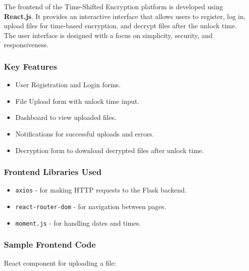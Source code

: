 \documentclass[12pt]{article}
\begin{document}
The frontend of the Time-Shifted Encryption platform is developed using \textbf{React.js}. It provides an interactive interface that allows users to register, log in, upload files for time-based encryption, and decrypt files after the unlock time. The user interface is designed with a focus on simplicity, security, and responsiveness.

\subsubsection{Key Features}

\begin{itemize}
    \item User Registration and Login forms.
    \item File Upload form with unlock time input.
    \item Dashboard to view uploaded files.
    \item Notifications for successful uploads and errors.
    \item Decryption form to download decrypted files after unlock time.
\end{itemize}

\subsubsection{Frontend Libraries Used}

\begin{itemize}
    \item \texttt{axios} - for making HTTP requests to the Flask backend.
    \item \texttt{react-router-dom} - for navigation between pages.
    \item \texttt{moment.js} - for handling dates and times.
\end{itemize}

\subsubsection{Sample Frontend Code}

React component for uploading a file:
\end{document}
